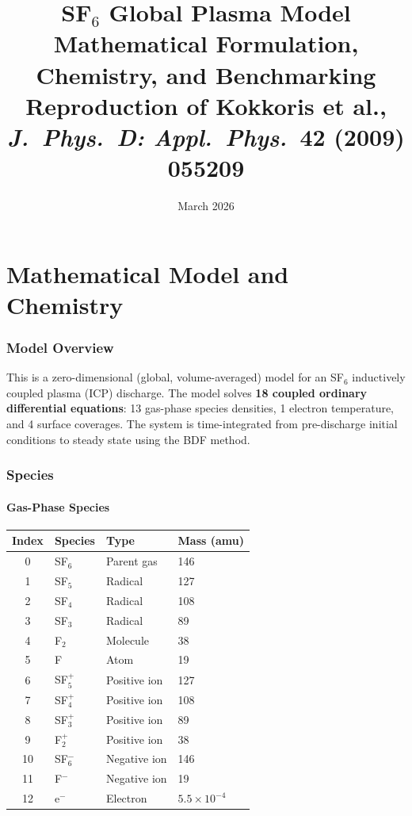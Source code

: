 \documentclass[11pt,a4paper]{article}
\title{\textbf{SF$_6$ Global Plasma Model}\\[6pt]
\large Mathematical Formulation, Chemistry, and Benchmarking\\[4pt]
\normalsize Reproduction of Kokkoris et al., \textit{J.\ Phys.\ D: Appl.\ Phys.}\ \textbf{42} (2009) 055209}
\date{March 2026}
\begin{document}
\maketitle
\tableofcontents
\newpage

\part{Mathematical Model and Chemistry}

\section{Model Overview}

This is a zero-dimensional (global, volume-averaged) model for an SF$_6$ inductively coupled plasma (ICP) discharge. The model solves \textbf{18 coupled ordinary differential equations}: 13 gas-phase species densities, 1 electron temperature, and 4 surface coverages. The system is time-integrated from pre-discharge initial conditions to steady state using the BDF method.

\section{Species}

\subsection{Gas-Phase Species}

\begin{table}[H]
\centering
\begin{tabular}{clll}
\toprule
\textbf{Index} & \textbf{Species} & \textbf{Type} & \textbf{Mass (amu)} \\
\midrule
0 & SF$_6$ & Parent gas & 146 \\ 1 & SF$_5$ & Radical & 127 \\ 2 & SF$_4$ & Radical & 108 \\
3 & SF$_3$ & Radical & 89 \\ 4 & F$_2$ & Molecule & 38 \\ 5 & F & Atom & 19 \\
6 & SF$_5^+$ & Positive ion & 127 \\ 7 & SF$_4^+$ & Positive ion & 108 \\
8 & SF$_3^+$ & Positive ion & 89 \\ 9 & F$_2^+$ & Positive ion & 38 \\
10 & SF$_6^-$ & Negative ion & 146 \\ 11 & F$^-$ & Negative ion & 19 \\
12 & e$^-$ & Electron & $5.5\times10^{-4}$ \\
\bottomrule
\end{tabular}
\end{table}
\end{document}
